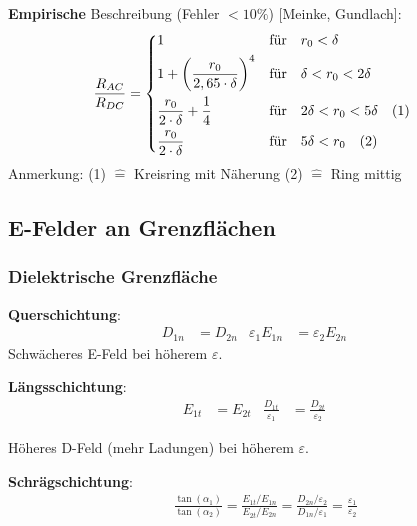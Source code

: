 \begin{description}
			\item \textbf{Empirische} Beschreibung (Fehler $ < 10\% $) [Meinke, Gundlach]:
				\begin{align*}
					\frac{R_{AC}}{R_{DC}} & =
					\begin{dcases}
						1                                                & \text{für} \quad r_0 < \delta                      \\
						1+ \left( \frac{r_0}{2,65\cdot \delta} \right)^4 & \text{für} \quad \delta < r_0 < 2\delta            \\
						\frac{r_0}{2 \cdot\delta} + \frac{1}{4}          & \text{für} \quad 2\delta < r_0 < 5\delta \quad (1) \\
						\frac{r_0}{2\cdot \delta}                        & \text{für} \quad 5\delta < r_0 \quad (2)
					\end{dcases}
				\end{align*}
				\footnotesize Anmerkung: (1) $\widehat{=}$ Kreisring mit Näherung \quad
				(2) $\widehat{=}$ Ring mittig
		\end{description}

\subsection{E-Felder an Grenzflächen}
	\subsubsection{Dielektrische Grenzfläche}
		\textbf{Querschichtung}:
		\begin{align*}
			D_{1n} & = D_{2n} & \varepsilon_1 E_{1n} & =\varepsilon_2 E_{2n} &
		\end{align*}
		Schwächeres E-Feld bei höherem $ \varepsilon $.

		\vspace{0.5em}
		\textbf{Längsschichtung}:
		\begin{align*}
			E_{1t} & = E_{2t} & \frac{D_{1t}}{\varepsilon_1} & = \frac{D_{2t}}{\varepsilon_2} &
		\end{align*}

		Höheres D-Feld (mehr Ladungen) bei höherem $ \varepsilon $.

		\vspace{0.5em}
		\textbf{Schrägschichtung}:
		\begin{align*}
			& \frac{\tan( \alpha_1)}{\tan( \alpha_2)} = \frac{E_{1t}/E_{1n}}{E_{2t}/E_{2n}} = \frac{D_{2n}/\varepsilon_2}{D_{1n}/\varepsilon_1} = \frac{ \varepsilon_1}{\varepsilon_2}
		\end{align*}

